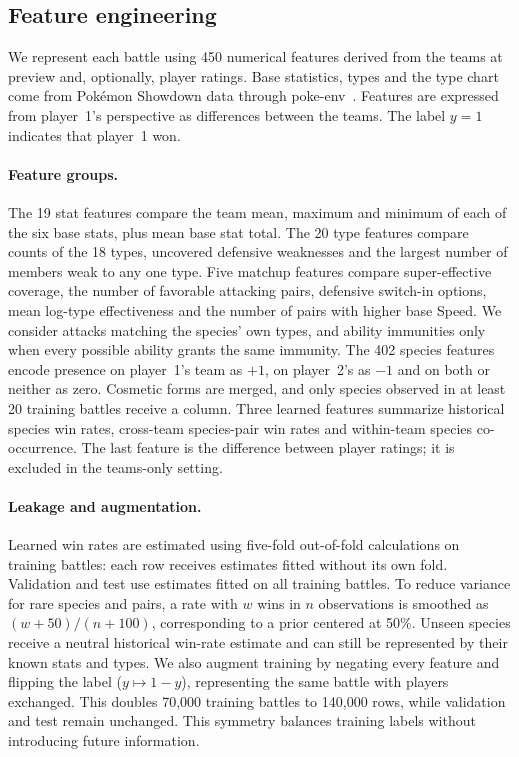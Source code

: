 \subsection{Feature engineering}
We represent each battle using 450 numerical features derived from the teams at
preview and, optionally, player ratings. Base statistics, types and the type
chart come from Pok\'emon Showdown data through poke-env~\cite{showdown,pokeenv}.
Features are expressed from player~1's perspective as differences between the
teams. The label $y=1$ indicates that player~1 won.

\paragraph{Feature groups.}
The 19 stat features compare the team mean, maximum and minimum of each of the
six base stats, plus mean base stat total. The 20 type features compare counts
of the 18 types, uncovered defensive weaknesses and the largest number of
members weak to any one type. Five matchup features compare super-effective
coverage, the number of favorable attacking pairs, defensive switch-in options,
mean log-type effectiveness and the number of pairs with higher base Speed.
We consider attacks matching the species' own types, and ability immunities
only when every possible ability grants the same immunity. The 402 species
features encode presence on player~1's team as $+1$, on player~2's as $-1$ and
on both or neither as zero. Cosmetic forms are merged, and only species
observed in at least 20 training battles receive a column. Three learned features
summarize historical species win rates, cross-team species-pair win rates and
within-team species co-occurrence. The last feature is the difference between
player ratings; it is excluded in the teams-only setting.

\paragraph{Leakage and augmentation.}
Learned win rates are estimated using five-fold out-of-fold calculations on
training battles: each row receives estimates fitted without its own fold.
Validation and test use estimates fitted on all training battles. To reduce
variance for rare species and pairs, a rate with $w$ wins in $n$ observations
is smoothed as $(w+50)/(n+100)$, corresponding to a prior centered at 50\%.
Unseen species receive a neutral historical win-rate estimate and can still be
represented by their known stats and types. We also augment training by
negating every feature and flipping the label ($y\mapsto 1-y$), representing
the same battle with players exchanged. This doubles 70{,}000 training battles
to 140{,}000 rows, while validation and test remain unchanged. This symmetry
balances training labels without introducing future information.
